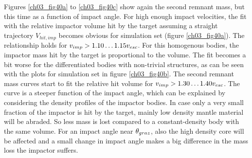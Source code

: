 
Figures \ref{ch03_fig40a} to \ref{ch03_fig40c} show again the second remnant mass, but this time as a function of impact angle. For high enough impact velocities, the fit with the relative impactor volume hit by the target assuming a straight trajectory $V_{hit, imp}$ becomes obvious for simulation set \rss (figure \ref{ch03_fig40a}). The relationship holds for $v_{imp} > 1.10 \dots 1.15 v_{esc}$. For this homogenous bodies, the impactor mass hit by the target is proportional to the volume. The fit becomes a bit worse for the differentiated bodies with non-trivial structures, as can be seen with the plots for simulation set \css in figure \ref{ch03_fig40b}. The second remnant mass curves start to fit the relative hit volume for $v_{imp} > 1.30 \dots 1.40 v_{esc}$. The curve is a steeper function of the impact angle, which can be explained by considering the density profiles of the impactor bodies. In case only a very small fraction of the impactor is hit by the target, mainly low density mantle material will be abraded. So less mass is lost compared to a constant-density body with the same volume. For an impact angle near $\theta_{graz}$, also the high density core will be affected and a small change in impact angle makes a big difference in the mass loss the impactor suffers.

